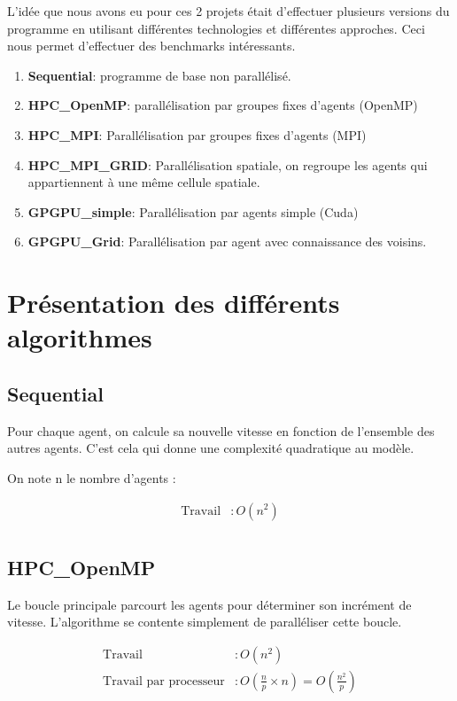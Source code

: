 \documentclass[liens,entete-ensimag,margeCorrection]{ensirapport}
\begin{document}
L'idée que nous avons eu pour ces 2 projets était d'effectuer plusieurs versions du programme en utilisant différentes technologies et différentes approches.
Ceci nous permet d'effectuer des benchmarks intéressants.

\begin{enumerate}
    \item \textbf{Sequential}: programme de base non parallélisé.
    \item \textbf{HPC\_OpenMP}: parallélisation par groupes fixes d'agents (OpenMP)
    \item \textbf{HPC\_MPI}: Parallélisation par groupes fixes d'agents (MPI)
    \item \textbf{HPC\_MPI\_GRID}: Parallélisation spatiale, on regroupe les agents qui appartiennent à une même cellule spatiale.
    \item \textbf{GPGPU\_simple}: Parallélisation par agents simple (Cuda)
    \item \textbf{GPGPU\_Grid}: Parallélisation par agent avec connaissance des voisins.

\end{enumerate}


\section{Présentation des différents algorithmes}
\subsection{Sequential}

Pour chaque agent, on calcule sa nouvelle vitesse en fonction de l'ensemble des autres agents.
C'est cela qui donne une complexité quadratique au modèle.

On note n le nombre d'agents :

\begin{align*}
    \text{Travail} &: O\left( n^2 \right)  \\
\end{align*}

\subsection{HPC\_OpenMP}
Le boucle principale parcourt les agents pour déterminer son incrément de vitesse.
L'algorithme se contente simplement de paralléliser cette boucle.

\begin{align*}
    \text{Travail} &: O\left( n^2 \right)  \\
    \text{Travail par processeur} &: O\left( \frac np \times n \right)  = O\left( \frac {n^2}p \right) \\
\end{align*}
\end{document}
